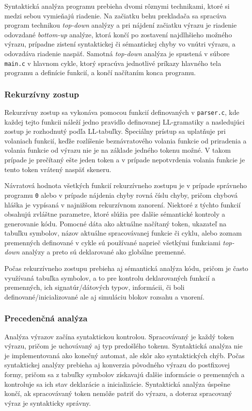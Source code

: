 \documentclass[a4paper,11pt]{article}
\begin{document}
Syntaktická analýza programu prebieha dvomi rôznymi technikami, ktoré si medzi sebou vymieňajú riadenie. Na začiatku behu prekladača sa spracúva program technikou \textit{top-down} analýzy a pri nájdení začiatku výrazu je riadenie odovzdané \textit{bottom-up} analýze, ktorá končí po zostavení najdlhšieho možného výrazu, prípadne zistení syntaktickej či sémantickej chyby vo vnútri výrazu, a odovzdáva riadenie naspäť. Samotná \textit{top-down} analýza je spustená v súbore \texttt{main.c} v hlavnom cykle, ktorý spracúva jednotlivé príkazy hlavného tela programu a definície funkcií, a končí načítaním konca programu.


\subsubsection{Rekurzívny zostup}
Rekurzívny zostup sa vykonáva pomocou funkcií definovaných v \texttt{parser.c}, kde každej tejto funkcii náleží jedno pravidlo definovanej LL-gramatiky a nasledujúci zostup je rozhodnutý podľa LL-tabuľky. Špeciálny prístup sa uplatňuje pri volaniach funkcií, keďže rozlíšenie beznávratového volania funkcie od priradenia a volania funkcie od výrazu nie je na základe jedného tokenu možné. V takom prípade je prečítaný ešte jeden token a v prípade nepotvrdenia volania funkcie je tento token vrátený naspäť skeneru.

	Návratová hodnota všetkých funkcií rekurzívneho zostupu je v prípade správneho programu \texttt{0} alebo v prípade nájdenia chyby rovná číslu chyby, pričom chybová hláška je vypísaná v najnižšom rekurzívnom zanorení. Niektoré z týchto funkcií obsahujú zvláštne parametre, ktoré slúžia pre ďalšie sémantické kontroly a generovanie kódu. Pomocné dáta ako aktuálne načítaný token, ukazateľ na tabuľku symbolov, názov aktuálne spracovávanej funkcie či cyklu, alebo zoznam premenných definované v cykle sú používané naprieč všetkými funkciami \textit{top-down} analýzy a preto sú deklarované ako globálne premenné.
	
 Počas rekurzívneho zostupu prebieha aj sémantická analýza kódu, pričom je často využívaná tabuľka symbolov, a to pre kontrolu deklarovaných funkcií a premenných, ich signatúr/dátových typov, informácii, či boli definované/inicializované ale aj simuláciu blokov rozsahu a vnorení.

\subsubsection{Precedenčná analýza}
Analýza výrazov začína syntaktickou kontrolou. Spracovávaný je každý token výrazu, pričom je uchovávaný aj typ predošlého tokenu. Syntaktická analýza nie je implementovaná ako konečný automat, ale skôr ako  syntaktických chýb. Počas syntaktickej analýzy prebieha aj konverzia pôvodného výrazu do postfixovej formy, pričom sa z tabuľky symbolov získavajú ďalšie informácie o premenných a kontroluje sa ich stav deklarácie a inicializácie. Syntaktická analýza úspešne končí, ak spracovávaný token nemôže patriť do výrazu, a doteraz spracovaný výraz je syntakticky správny.
\end{document}
